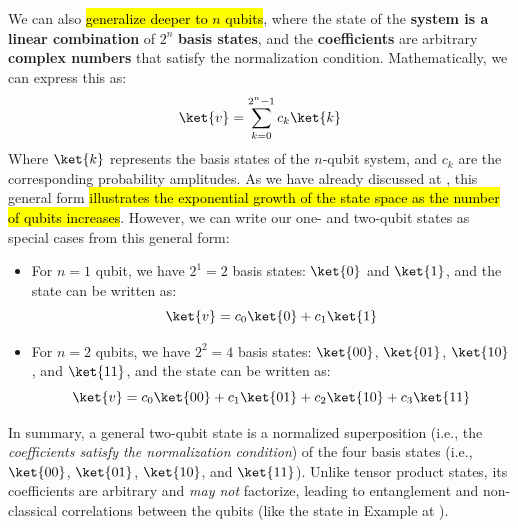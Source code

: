 \highspace
We can also \hl{generalize deeper to $n$ qubits}, where the state of the \textbf{system is a linear combination} of $2^n$ \textbf{basis states}, and the \textbf{coefficients} are arbitrary \textbf{complex numbers} that satisfy the normalization condition. Mathematically, we can express this as:
\begin{equation}\label{eq:general-multiple-qubit-state}
    \ket{v} = \sum_{k=0}^{2^n-1} c_k \ket{k}
\end{equation}
Where $\ket{k}$ represents the basis states of the $n$-qubit system, and $c_k$ are the corresponding probability amplitudes.  As we have already discussed at , this general form \hl{illustrates the exponential growth of the state space as the number of qubits increases}. However, we can write our one- and two-qubit states as special cases from this general form:
\begin{itemize}
    \item For $n=1$ qubit, we have $2^1 = 2$ basis states: $\ket{0}$ and $\ket{1}$, and the state can be written as:
    \begin{equation*}
        \ket{v} = c_0 \ket{0} + c_1 \ket{1}
    \end{equation*}
    \item For $n=2$ qubits, we have $2^2 = 4$ basis states: $\ket{00}$, $\ket{01}$, $\ket{10}$, and $\ket{11}$, and the state can be written as:
    \begin{equation*}
        \ket{v} = c_0 \ket{00} + c_1 \ket{01} + c_2 \ket{10} + c_3 \ket{11}
    \end{equation*}
\end{itemize}

\highspace
In summary, a general two-qubit state is a normalized superposition (i.e., the \emph{coefficients satisfy the normalization condition}) of the four basis states (i.e., $\ket{00}$, $\ket{01}$, $\ket{10}$, and $\ket{11}$). Unlike tensor product states, its coefficients are arbitrary and \emph{may not} factorize, leading to entanglement and non-classical correlations between the qubits (like the state in Example at ).
